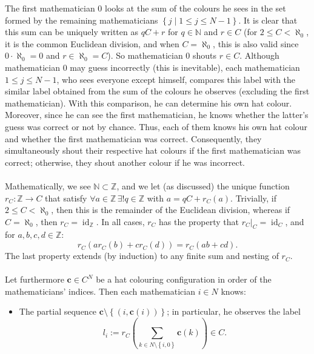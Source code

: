 \documentclass[11pt, a4paper, oneside]{article}
\theoremstyle{remark}
\theoremstyle{lemma}
\begin{document}
The first mathematician \(0\) looks at the sum of the colours he sees in the set formed by the remaining mathematicians \(\left\{ j \mid 1 \leq j \leq N - 1 \right\}\). It is clear that this sum can be uniquely written as \(qC + r\) for \(q \in \mathbb{N}\) and \(r \in C\) (for \(2 \leq C < \aleph_0\), it is the common Euclidean division, and when \(C = \aleph_0\), this is also valid since \(0 \cdot \aleph_0 = 0\) and \(r \in \aleph_0 = C\)). So mathematician \(0\) shouts \(r \in C\). Although mathematician \(0\) may guess incorrectly (this is inevitable), each mathematician \(1 \leq j \leq N - 1\), who sees everyone except himself, compares this label with the similar label obtained from the sum of the colours he observes (excluding the first mathematician). With this comparison, he can determine his own hat colour. Moreover, since he can see the first mathematician, he knows whether the latter's guess was correct or not by chance. Thus, each of them knows his own hat colour and whether the first mathematician was correct. Consequently, they simultaneously shout their respective hat colours if the first mathematician was correct; otherwise, they shout another colour if he was incorrect.
\\\\
Mathematically, we see \(\mathbb{N} \subset \mathbb{Z}\), and we let (as discussed) the unique function \(r_{C} : \mathbb{Z} \rightarrow C\) that satisfy \(\forall a \in \mathbb{Z}\, \exists! q \in \mathbb{Z}\) with \(a = qC + r_{C}(a)\). Trivially, if \(2 \leq C < \aleph_0\), then this is the remainder of the Euclidean division, whereas if \(C = \aleph_0\), then \(r_C = \operatorname{id}_{\mathbb{Z}}\). In all cases, \(r_C\) has the property that \(r_{C}\big|_{C} = \operatorname{id}_{C}\), and for \(a, b, c, d \in \mathbb{Z}\):
\[
r_{C}\left( a r_{C}\left( b \right) + c r_{C}\left( d \right) \right) = r_{C}\left( ab + cd \right).
\]
The last property extends (by induction) to any finite sum and nesting of \( r_{C} \).
\\\\
Let furthermore \(\mathbf{c} \in C^N\) be a hat colouring configuration in order of the mathematicians’ indices. Then each mathematician \(i \in N\) knows:
\begin{itemize}
    \item The partial sequence \(\mathbf{c} \setminus \left\{ \left( i, \mathbf{c}(i) \right) \right\}\); in particular, he observes the label
    \[
    l_i := r_{C}\left( \sum_{k \in N \setminus \left\{ i, 0 \right\}} \mathbf{c}(k) \right) \in C.
    \]
\end{itemize}
\end{document}
